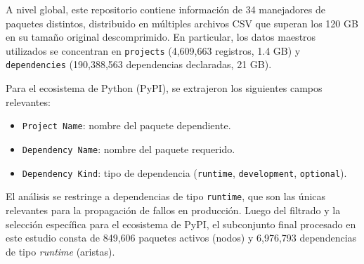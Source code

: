 A nivel global, este repositorio contiene información de 34 manejadores de paquetes distintos, distribuido en múltiples archivos CSV que superan los 120 GB en su tamaño original descomprimido. En particular, los datos maestros utilizados se concentran en \texttt{projects} (4,609,663 registros, 1.4 GB) y \texttt{dependencies} (190,388,563 dependencias declaradas, 21 GB).

Para el ecosistema de Python (PyPI), se extrajeron los siguientes campos relevantes:
\begin{itemize}
    \item \texttt{Project Name}: nombre del paquete dependiente.
    \item \texttt{Dependency Name}: nombre del paquete requerido.
    \item \texttt{Dependency Kind}: tipo de dependencia (\texttt{runtime},
          \texttt{development}, \texttt{optional}).
\end{itemize}
El análisis se restringe a dependencias de tipo \texttt{runtime}, que son las únicas relevantes para la propagación de fallos en producción. Luego del filtrado y la selección específica para el ecosistema de PyPI, el subconjunto final procesado en este estudio consta de 849,606 paquetes activos (nodos) y 6,976,793 dependencias de tipo \textit{runtime} (aristas).

